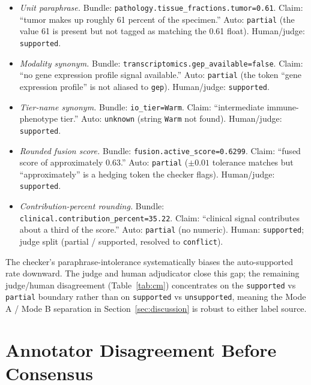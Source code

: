 \documentclass{article}
\theoremstyle{plain}
\begin{document}
\begin{itemize}
\item \emph{Unit paraphrase.} Bundle: \texttt{pathology.tissue\_fractions.tumor=0.61}. Claim: ``tumor makes up roughly 61 percent of the specimen.'' Auto: \texttt{partial} (the value 61 is present but not tagged as matching the 0.61 float). Human/judge: \texttt{supported}.
\item \emph{Modality synonym.} Bundle: \texttt{transcriptomics.gep\_available=false}. Claim: ``no gene expression profile signal available.'' Auto: \texttt{partial} (the token ``gene expression profile'' is not aliased to \texttt{gep}). Human/judge: \texttt{supported}.
\item \emph{Tier-name synonym.} Bundle: \texttt{io\_tier=Warm}. Claim: ``intermediate immune-phenotype tier.'' Auto: \texttt{unknown} (string \texttt{Warm} not found). Human/judge: \texttt{supported}.
\item \emph{Rounded fusion score.} Bundle: \texttt{fusion.active\_score=0.6299}. Claim: ``fused score of approximately 0.63.'' Auto: \texttt{partial} ($\pm 0.01$ tolerance matches but ``approximately'' is a hedging token the checker flags). Human/judge: \texttt{supported}.
\item \emph{Contribution-percent rounding.} Bundle: \texttt{clinical.contribution\_percent=35.22}. Claim: ``clinical signal contributes about a third of the score.'' Auto: \texttt{partial} (no numeric). Human: \texttt{supported}; judge split (partial / supported, resolved to \texttt{conflict}).
\end{itemize}

The checker's paraphrase-intolerance systematically biases the auto-supported rate downward. The judge and human adjudicator close this gap; the remaining judge/human disagreement (Table~\ref{tab:cm}) concentrates on the \texttt{supported} vs \texttt{partial} boundary rather than on \texttt{supported} vs \texttt{unsupported}, meaning the Mode A / Mode B separation in Section~\ref{sec:discussion} is robust to either label source.

\section{Annotator Disagreement Before Consensus}
\label{app:annot}
\end{document}
